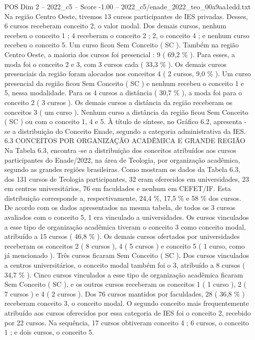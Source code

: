 \begin{textsample}{POS Dim 2 – 2022\_c5 – Score -1.00 – 2022\_c5/enade\_2022\_teo\_00a9aa1edd.txt}
Na região Centro Oeste, tivemos 13 cursos participantes de IES privadas.
Desses, 6 cursos receberam conceito 2, o valor modal.
Dos demais cursos, nenhum recebeu o conceito 1 ; 4 receberam o conceito 2 ; 2, o conceito 4 ; e nenhum curso recebeu o conceito 5.
Um curso ficou Sem Conceito ( SC ).
Também na região Centro Oeste, a maioria dos cursos foi presencial : 9 ( 69,2 \% ).
Para esses, a moda foi o conceito 2 e 3, com 3 cursos cada ( 33,3 \% ).
Os demais cursos presenciais da região foram alocados nos conceitos 4 ( 2 cursos, 9,0 \% ).
Um curso presencial da região ficou Sem Conceito ( SC ) e nenhum recebeu o conceito 1 e 5, nessa modalidade.
Para os 4 cursos a distância ( 30,7 \% ), a moda foi para o conceito 2 ( 3 cursos ).
Os demais cursos a distância da região receberam os conceitos 3 ( um curso ).
Nenhum curso a distância da região ficou Sem Conceito ( SC ) ou com o conceito 1, 4 e 5.
À título de síntese, no Gráfico 6.2, apresenta -se a distribuição do Conceito Enade, segundo a categoria administrativa da IES. 6.3 CONCEITOS POR ORGANIZAÇÃO ACADÊMICA E GRANDE REGIÃO Na Tabela 6.3, encontra -se a distribuição dos conceitos atribuídos aos cursos participantes do Enade/2022, na área de Teologia, por organização acadêmica, segundo as grandes regiões brasileiras.
Como mostram os dados da Tabela 6.3, dos 131 cursos de Teologia participantes, 32 eram oferecidos em universidades, 23 em centros universitários, 76 em faculdades e nenhum em CEFET/IF.
Esta distribuição corresponde a, respectivamente, 24,4 \%, 17,5 \% e 58 \% dos cursos.
De acordo com os dados apresentados na mesma tabela, de todos os 3 cursos avaliados com o conceito 5, 1 era vinculado a universidades.
Os cursos vinculados a esse tipo de organização acadêmica tiveram o conceito 3 como conceito modal, atribuído a 15 cursos ( 46,8 \% ).
Os demais cursos ofertados por universidades receberam os conceitos 2 ( 8 cursos ), 4 ( 5 cursos ) e conceito 5 ( 1 curso, como já mencionado ).
Três cursos ficaram Sem Conceito ( SC ).
Dos cursos vinculados a centros universitários, o conceito modal também foi o 3, atribuído a 8 cursos ( 34,7 \% ).
Cinco cursos vinculados a esse tipo de organização acadêmica ficaram Sem Conceito ( SC ), e os outros cursos receberam os conceitos 1 ( 1 curso ), 2 ( 7 cursos ) e 4 ( 2 cursos ).
Dos 76 cursos mantidos por faculdades, 28 ( 36,8 \% ) receberam conceito 3, o conceito modal.
O segundo conceito mais frequentemente atribuído aos cursos oferecidos por essa categoria de IES foi o conceito 2, recebido por 22 cursos.
Na sequência, 17 cursos obtiveram conceito 4 ; 6 cursos, o conceito 1 ; e dois cursos, o conceito 5.

\end{textsample}
